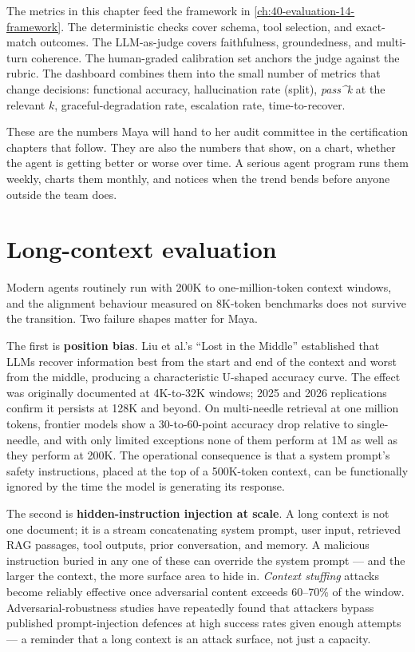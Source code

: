 The metrics in this chapter feed the framework in \autoref{ch:40-evaluation-14-framework}. The deterministic checks cover schema, tool selection, and exact-match outcomes. The LLM-as-judge covers faithfulness, groundedness, and multi-turn coherence. The human-graded calibration set anchors the judge against the rubric. The dashboard combines them into the small number of metrics that change decisions: functional accuracy, hallucination rate (split), \textit{pass\textasciicircum k} at the relevant $k$, graceful-degradation rate, escalation rate, time-to-recover.

These are the numbers Maya will hand to her audit committee in the certification chapters that follow. They are also the numbers that show, on a chart, whether the agent is getting better or worse over time. A serious agent program runs them weekly, charts them monthly, and notices when the trend bends before anyone outside the team does.

\section{Long-context evaluation}

Modern agents routinely run with 200K to one-million-token context windows, and the alignment behaviour measured on 8K-token benchmarks does not survive the transition. Two failure shapes matter for Maya.

The first is \textbf{position bias}. Liu et al.'s ``Lost in the Middle'' \citep{liu2023lostmiddle} established that LLMs recover information best from the start and end of the context and worst from the middle, producing a characteristic U-shaped accuracy curve. The effect was originally documented at 4K-to-32K windows; 2025 and 2026 replications confirm it persists at 128K and beyond. On multi-needle retrieval at one million tokens, frontier models show a 30-to-60-point accuracy drop relative to single-needle, and with only limited exceptions none of them perform at 1M as well as they perform at 200K. The operational consequence is that a system prompt's safety instructions, placed at the top of a 500K-token context, can be functionally ignored by the time the model is generating its response.

The second is \textbf{hidden-instruction injection at scale}. A long context is not one document; it is a stream concatenating system prompt, user input, retrieved RAG passages, tool outputs, prior conversation, and memory. A malicious instruction buried in any one of these can override the system prompt --- and the larger the context, the more surface area to hide in. \textit{Context stuffing} attacks become reliably effective once adversarial content exceeds 60--70\% of the window. Adversarial-robustness studies have repeatedly found that attackers bypass published prompt-injection defences at high success rates given enough attempts --- a reminder that a long context is an attack surface, not just a capacity.

